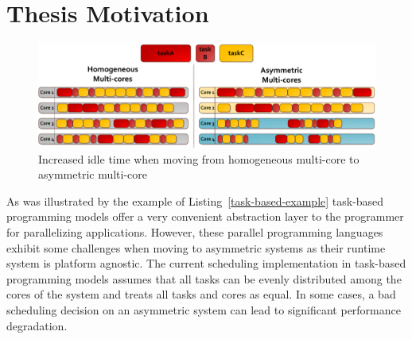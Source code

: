 \section{Thesis Motivation}
\begin{figure}[t]%
	\centering
	\includegraphics[width=\textwidth]{figures/thesis_motivation.pdf}
	\caption{Increased idle time when moving from homogeneous multi-core to asymmetric multi-core}
	\label{fig:thesis_motivation}
\end{figure}

As was illustrated by the example of Listing~\ref{task-based-example} task-based programming models offer a very convenient abstraction layer to the programmer for parallelizing applications.
However, these parallel programming languages exhibit some challenges when moving to asymmetric systems as their runtime system is platform agnostic.
The current scheduling implementation in task-based programming models assumes that all tasks can be evenly distributed among the cores of the system and treats all tasks and cores as equal.
In some cases, a bad scheduling decision on an asymmetric system can lead to significant performance degradation. 

